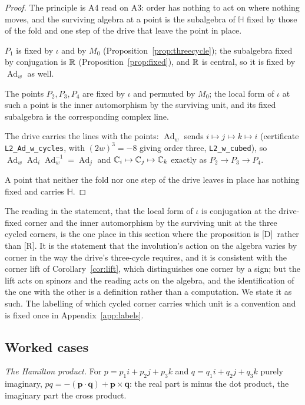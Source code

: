 \documentclass[11pt,a4paper]{article}
\theoremstyle{plain}
\theoremstyle{definition}
\theoremstyle{remark}
\newcommand{\Hquat}{\mathbb{H}}
\newcommand{\Ad}{\operatorname{Ad}}
\newcommand{\rigR}{[\textup{R}]}
\newcommand{\rigD}{[\textup{D}]}
\begin{document}
\begin{proof}
The principle is A4 read on A3: order has nothing to act on where nothing moves, and the surviving algebra at a point is the subalgebra of $\Hquat$ fixed by those of the fold and one step of the drive that leave the point in place.

$P_{1}$ is fixed by $\iota$ and by $M_{0}$ (Proposition~\ref{prop:threecycle}); the subalgebra fixed by conjugation is $\mathbb{R}$ (Proposition~\ref{prop:fixed}), and $\mathbb{R}$ is central, so it is fixed by $\Ad_{w}$ as well.

The points $P_{2},P_{3},P_{4}$ are fixed by $\iota$ and permuted by $M_{0}$; the local form of $\iota$ at such a point is the inner automorphism by the surviving unit, and its fixed subalgebra is the corresponding complex line.

The drive carries the lines with the points: $\Ad_{w}$ sends $i\mapsto j\mapsto k\mapsto i$ (certificate \texttt{L2\_Ad\_w\_cycles}, with $(2w)^{3}=-8$ giving order three, \texttt{L2\_w\_cubed}), so $\Ad_{w}\Ad_{i}\Ad_{w}^{-1}=\Ad_{j}$ and $\mathbb{C}_{i}\mapsto\mathbb{C}_{j}\mapsto\mathbb{C}_{k}$ exactly as $P_{2}\to P_{3}\to P_{4}$.

A point that neither the fold nor one step of the drive leaves in place has nothing fixed and carries $\Hquat$.
\end{proof}

The reading in the statement, that the local form of $\iota$ is conjugation at the drive-fixed corner and the inner automorphism by the surviving unit at the three cycled corners, is the one place in this section where the proposition is \rigD\ rather than \rigR. It is the statement that the involution's action on the algebra varies by corner in the way the drive's three-cycle requires, and it is consistent with the corner lift of Corollary~\ref{cor:lift}, which distinguishes one corner by a sign; but the lift acts on spinors and the reading acts on the algebra, and the identification of the one with the other is a definition rather than a computation. We state it as such. The labelling of which cycled corner carries which unit is a convention and is fixed once in Appendix~\ref{app:labels}.

\subsection{Worked cases}\label{sec:fibre-worked}

\emph{The Hamilton product.} For $p=p_{1}i+p_{2}j+p_{3}k$ and $q=q_{1}i+q_{2}j+q_{3}k$ purely imaginary, $pq=-(\mathbf p\cdot\mathbf q)+\mathbf p\times\mathbf q$: the real part is minus the dot product, the imaginary part the cross product.
\end{document}
